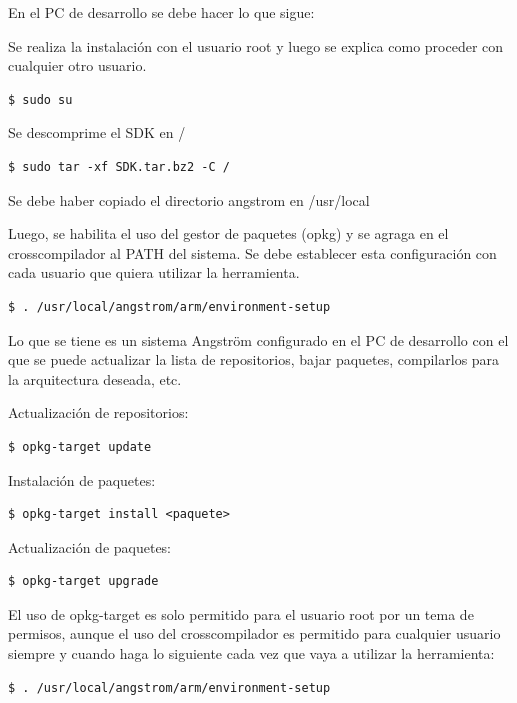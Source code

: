 \bigskip
En el PC de desarrollo se debe hacer lo que sigue:

\bigskip
Se realiza la instalación con el usuario root y luego se explica como proceder con cualquier otro usuario.

\begin{verbatim}
$ sudo su
\end{verbatim}

Se descomprime el SDK en /

\begin{verbatim}
$ sudo tar -xf SDK.tar.bz2 -C /
\end{verbatim}

Se debe haber copiado el directorio angstrom en /usr/local

\bigskip
Luego, se habilita el uso del gestor de paquetes (opkg) y se agraga en el crosscompilador al PATH del sistema. Se debe establecer esta configuración con cada usuario que quiera utilizar la herramienta.

\begin{verbatim}
$ . /usr/local/angstrom/arm/environment-setup
\end{verbatim}

Lo que se tiene es un sistema Angström configurado en el PC de desarrollo con el que se puede actualizar la lista de repositorios, bajar paquetes, compilarlos para la arquitectura deseada, etc.

\bigskip
Actualización de repositorios:

\begin{verbatim}
$ opkg-target update
\end{verbatim}

Instalación de paquetes:

\begin{verbatim}
$ opkg-target install <paquete>
\end{verbatim}

Actualización de paquetes:

\begin{verbatim}
$ opkg-target upgrade
\end{verbatim}

El uso de opkg-target es solo permitido para el usuario root por un tema de permisos, aunque el uso del crosscompilador es permitido para cualquier usuario siempre y cuando haga lo siguiente cada vez que vaya a utilizar la herramienta:

\begin{verbatim}
$ . /usr/local/angstrom/arm/environment-setup
\end{verbatim}

